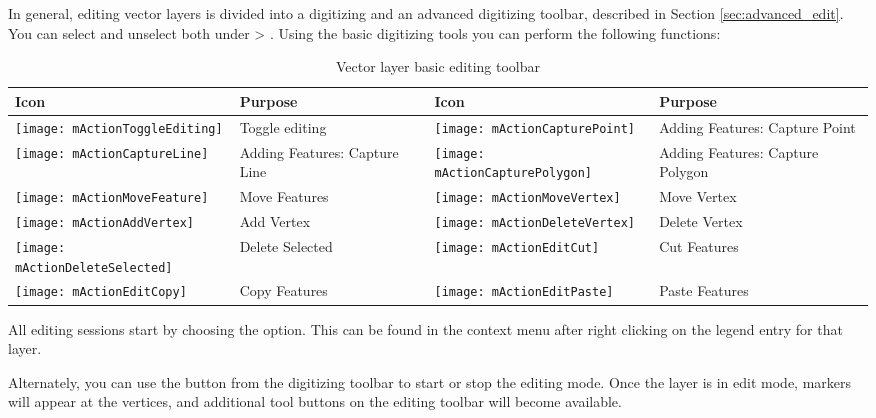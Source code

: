 In general, editing vector layers is divided into a digitizing and an advanced
digitizing toolbar, described in Section \ref{sec:advanced_edit}. You can
select and unselect both under  > .
Using the basic digitizing tools you can perform the following functions:

\begin{table}[h]
\centering
\caption{Vector layer basic editing toolbar}\label{tab:vector_editing}\medskip
\small
\begin{tabular}{|l|p{6.9cm}|l|p{6.9cm}|}
\hline \textbf{Icon} & \textbf{Purpose} & \textbf{Icon} & \textbf{Purpose} \\
\hline \texttt{[image: mActionToggleEditing]}
   & Toggle editing
   & \texttt{[image: mActionCapturePoint]}
   & Adding Features: Capture Point \\
\hline \texttt{[image: mActionCaptureLine]}
   & Adding Features: Capture Line
   & \texttt{[image: mActionCapturePolygon]}
   & Adding Features: Capture Polygon \\
\hline \texttt{[image: mActionMoveFeature]}
   & Move Features
   & \texttt{[image: mActionMoveVertex]}
   & Move Vertex \\
\hline \texttt{[image: mActionAddVertex]}
   & Add Vertex
   & \texttt{[image: mActionDeleteVertex]}
   & Delete Vertex \\
\hline \texttt{[image: mActionDeleteSelected]}
   & Delete Selected
   & \texttt{[image: mActionEditCut]}
   & Cut Features \\
\hline \texttt{[image: mActionEditCopy]}
   & Copy Features
   & \texttt{[image: mActionEditPaste]} 
   & Paste Features \\
\hline
\end{tabular}
\end{table}

All editing sessions start by choosing the
 option.
This can be found in the context menu after right clicking on the legend
entry for that layer.

Alternately, you can use the 
 button from the digitizing
toolbar to start or stop the editing mode. Once the
layer is in edit mode, markers will appear at the vertices, and additional
tool buttons on the editing toolbar will become available.

